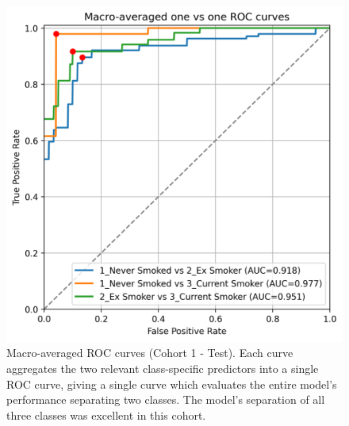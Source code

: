 \documentclass{article} %
\begin{document}
\begin{figure}[p]
    \centering
    \includegraphics[width=0.7\linewidth]{cohort1/test_macro_ovo_roc.png}
    \caption[Macro-averaged ROC curves (Cohort 1 - Test)]{Macro-averaged ROC curves (Cohort 1 - Test). Each curve aggregates the two relevant class-specific predictors into a single ROC curve, giving a single curve which evaluates the entire model's performance separating two classes. The model's separation of all three classes was excellent in this cohort.}
    \label{fig:cohort1-macro-rocs}
\end{figure}
\end{document}
